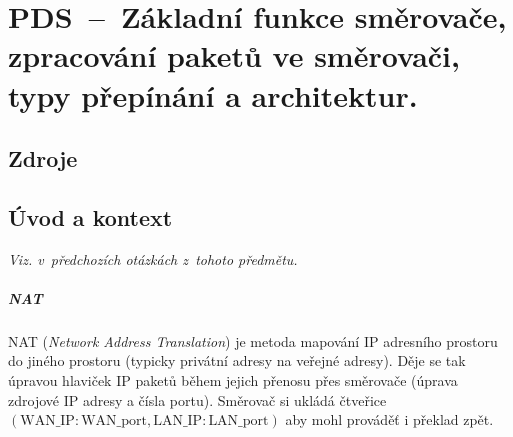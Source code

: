 

\graphicspath{{pds/smerovace/figures}}


\chapter{PDS~--~Základní funkce směrovače, zpracování paketů ve směrovači, typy přepínání a architektur.}


\section{Zdroje}

\begin{compactitem}
    \item {}
    \item {}
\end{compactitem}


\section{Úvod a kontext}


\textit{Viz.  v~předchozích otázkách z~tohoto předmětu.}

\paragraph*{NAT} NAT (\textit{Network Address Translation}) je metoda mapování IP adresního prostoru do jiného prostoru (typicky privátní adresy na veřejné adresy). Děje se tak úpravou hlaviček IP paketů během jejich přenosu přes směrovače (úprava zdrojové IP adresy a čísla portu). Směrovač si ukládá čtveřice $(\text{WAN\_IP}:\text{WAN\_port}, \text{LAN\_IP}:\text{LAN\_port})$ aby mohl prováděť i překlad zpět.


